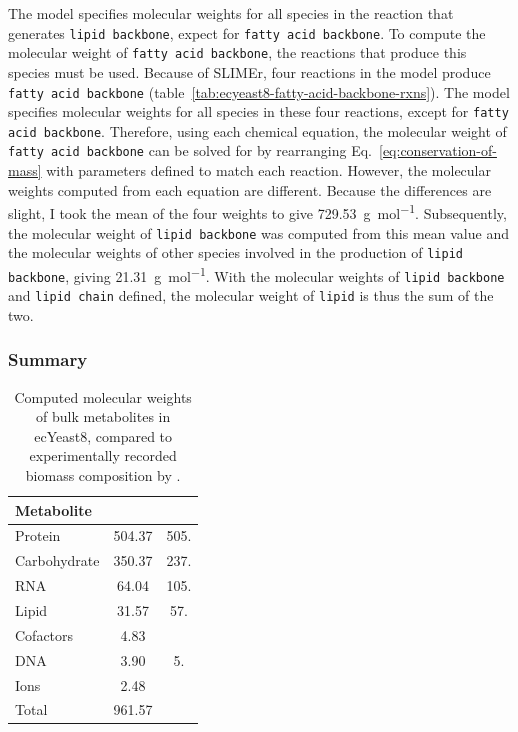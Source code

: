 The model specifies molecular weights for all species in the reaction that generates \texttt{lipid backbone}, expect for \texttt{fatty acid backbone}.
To compute the molecular weight of \texttt{fatty acid backbone}, the reactions that produce this species must be used.
Because of SLIMEr, four reactions in the model produce \texttt{fatty acid backbone} (table~\ref{tab:ecyeast8-fatty-acid-backbone-rxns}).
The model specifies molecular weights for all species in these four reactions, except for \texttt{fatty acid backbone}.
Therefore, using each chemical equation, the molecular weight of \texttt{fatty acid backbone} can be solved for by rearranging Eq.\ \ref{eq:conservation-of-mass} with parameters defined to match each reaction.
However, the molecular weights computed from each equation are different.%
Because the differences are slight, %
I took the mean of the four weights to give \SI{729.53}{\gram~\mole^{-1}}.
Subsequently, the molecular weight of \texttt{lipid backbone} was computed from this mean value and the molecular weights of other species involved in the production of \texttt{lipid backbone}, giving \SI{21.31}{\gram~\mole^{-1}}.
With the molecular weights of \texttt{lipid backbone} and \texttt{lipid chain} defined, the molecular weight of \texttt{lipid} is thus the sum of the two.


\subsubsection{Summary}
\label{subsubsec:model-yeast8-molweight-summary}

\begin{table}[ht]
  \centering
  \begin{tabular}{lSS}
    Metabolite & {} & {} \\
    \hline
    Protein & 504.37 & 505.\\
    Carbohydrate & 350.37 & 237.\\
    RNA & 64.04 & 105.\\
    Lipid & 31.57 & 57.\\
    Cofactors & 4.83 & \\
    DNA & 3.90 & 5. \\
    Ions & 2.48 & \\
    \hline
    Total & 961.57 & \\
  \end{tabular}
  \caption{
    Computed molecular weights of bulk metabolites in ecYeast8, compared to experimentally recorded biomass composition by \textcite{canelasVivoDatadrivenFramework2011}.
  }
  \label{tab:ecyeast8-mol-weights}
\end{table}

